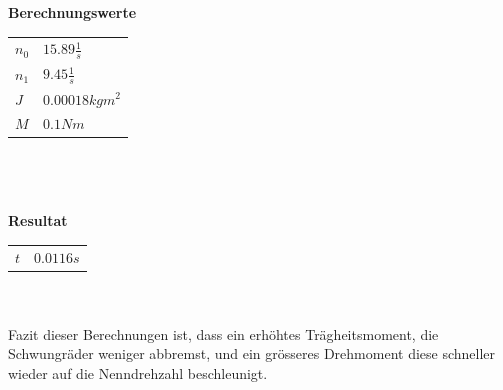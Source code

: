 \textbf{Berechnungswerte}\\
\begin{tabular}{ll}
	\rule{0pt}{11pt} $n_0$ & $15.89 \frac{1}{s}$ \\
	\rule{0pt}{11pt} $n_1$ & $9.45 \frac{1}{s}$ \\
	\rule{0pt}{11pt} $J$ & $0.00018 kgm^2$ \\
	\rule{0pt}{11pt} $M$ & $0.1 Nm$ \\
\end{tabular}\\
\\
\\
\textbf{Resultat}\\
\begin{tabular}{ll}
	\rule{0pt}{11pt} $t$ & $0.0116 s$ \\
\end{tabular}\\
\\
Fazit dieser Berechnungen ist, dass ein erhöhtes Trägheitsmoment, die Schwungräder 
weniger abbremst, und ein grösseres Drehmoment diese schneller wieder auf die 
Nenndrehzahl beschleunigt. 
